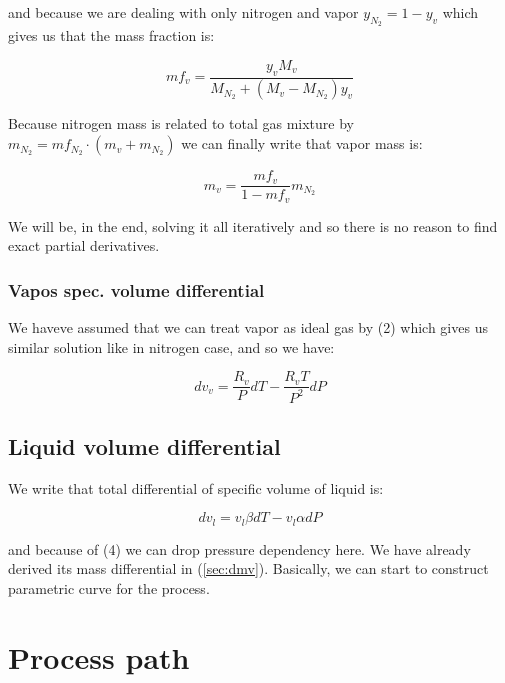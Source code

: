 \documentclass[10pt, letterpaper]{article}
\begin{document}
	and because we are dealing with only nitrogen and vapor $y_{N_{2}} = 1 - y_{v}$ which gives us that the mass fraction is:

	\begin{equation*}
		mf_{v} = \frac{y_{v} M_{v}}{M_{N_{2}} + (M_{v} - M_{N_{2}}) y_{v}}
	\end{equation*}

	Because nitrogen mass is related to total gas mixture by $m_{N_{2}} = mf_{N_{2}} \cdot (m_{v} + m_{N_{2}})$ we can finally write that vapor mass is:

	\begin{equation*}
		m_{v} = \frac{mf_{v}}{1 - mf_{v}} m_{N_{2}}
	\end{equation*}

	We will be, in the end, solving it all iteratively and so there is no reason to find exact partial derivatives.

	\subsubsection{Vapos spec. volume differential}
	\label{sec:dvv}

	We haveve assumed that we can treat vapor as ideal gas by (2) which gives us similar solution like in nitrogen case, and so we have:

	\begin{equation*}
		dv_{v} = \frac{R_{v}}{P} dT - \frac{R_{v} T}{P^{2}} dP
	\end{equation*}

	\subsection{Liquid volume differential}
	\label{sec:dVl}

	We write that total differential of specific volume of liquid is:

	\begin{equation*}
		dv_{l} = v_{l} \beta dT - v_{l} \alpha dP
	\end{equation*}

	and because of (4) we can drop pressure dependency here. We have already derived its mass differential in (\ref{sec:dmv}). Basically, we can start to construct parametric curve for the process.

	\section{Process path}
	\label{sec:proces path}
\end{document}
